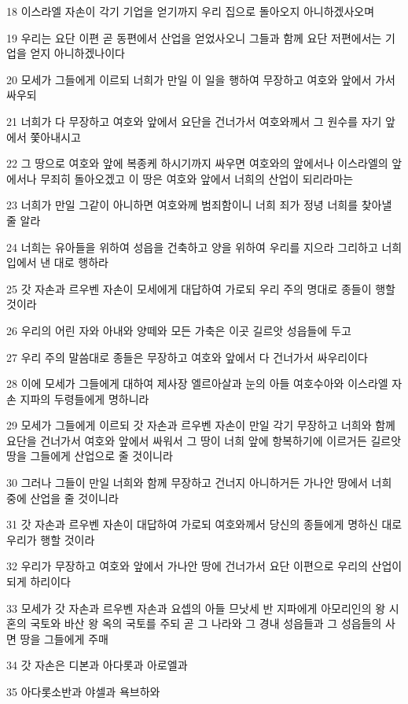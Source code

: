 \par 18 이스라엘 자손이 각기 기업을 얻기까지 우리 집으로 돌아오지 아니하겠사오며
\par 19 우리는 요단 이편 곧 동편에서 산업을 얻었사오니 그들과 함께 요단 저편에서는 기업을 얻지 아니하겠나이다
\par 20 모세가 그들에게 이르되 너희가 만일 이 일을 행하여 무장하고 여호와 앞에서 가서 싸우되
\par 21 너희가 다 무장하고 여호와 앞에서 요단을 건너가서 여호와께서 그 원수를 자기 앞에서 쫓아내시고
\par 22 그 땅으로 여호와 앞에 복종케 하시기까지 싸우면 여호와의 앞에서나 이스라엘의 앞에서나 무죄히 돌아오겠고 이 땅은 여호와 앞에서 너희의 산업이 되리라마는
\par 23 너희가 만일 그같이 아니하면 여호와께 범죄함이니 너희 죄가 정녕 너희를 찾아낼 줄 알라
\par 24 너희는 유아들을 위하여 성읍을 건축하고 양을 위하여 우리를 지으라 그리하고 너희 입에서 낸 대로 행하라
\par 25 갓 자손과 르우벤 자손이 모세에게 대답하여 가로되 우리 주의 명대로 종들이 행할 것이라
\par 26 우리의 어린 자와 아내와 양떼와 모든 가축은 이곳 길르앗 성읍들에 두고
\par 27 우리 주의 말씀대로 종들은 무장하고 여호와 앞에서 다 건너가서 싸우리이다
\par 28 이에 모세가 그들에게 대하여 제사장 엘르아살과 눈의 아들 여호수아와 이스라엘 자손 지파의 두령들에게 명하니라
\par 29 모세가 그들에게 이르되 갓 자손과 르우벤 자손이 만일 각기 무장하고 너희와 함께 요단을 건너가서 여호와 앞에서 싸워서 그 땅이 너희 앞에 항복하기에 이르거든 길르앗 땅을 그들에게 산업으로 줄 것이니라
\par 30 그러나 그들이 만일 너희와 함께 무장하고 건너지 아니하거든 가나안 땅에서 너희 중에 산업을 줄 것이니라
\par 31 갓 자손과 르우벤 자손이 대답하여 가로되 여호와께서 당신의 종들에게 명하신 대로 우리가 행할 것이라
\par 32 우리가 무장하고 여호와 앞에서 가나안 땅에 건너가서 요단 이편으로 우리의 산업이 되게 하리이다
\par 33 모세가 갓 자손과 르우벤 자손과 요셉의 아들 므낫세 반 지파에게 아모리인의 왕 시혼의 국토와 바산 왕 옥의 국토를 주되 곧 그 나라와 그 경내 성읍들과 그 성읍들의 사면 땅을 그들에게 주매
\par 34 갓 자손은 디본과 아다롯과 아로엘과
\par 35 아다롯소반과 야셀과 욕브하와
